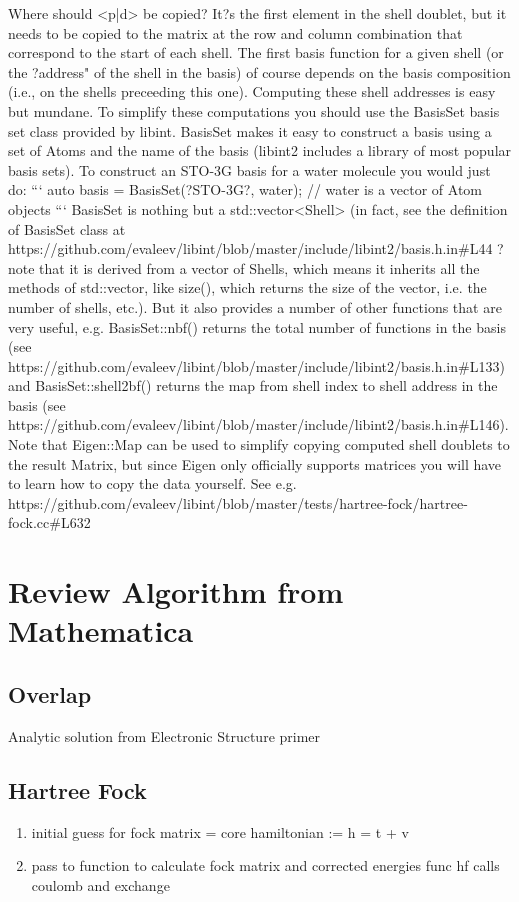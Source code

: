 \documentclass[11pt, oneside]{article}   	%
\begin{document}
Where should <p|d> be copied? It?s the first element in the shell doublet, but it needs to be copied to the matrix at the row and column combination that correspond to the start of each shell. The first basis function for a given shell (or the ?address" of the shell in the basis) of course depends on the basis composition (i.e., on the shells preceeding this one). Computing these shell addresses is easy but mundane. To simplify these computations you should use the BasisSet basis set class provided by libint.
BasisSet makes it easy to construct a basis using a set of Atoms and the name of the basis (libint2 includes a library of most popular basis sets). To construct an STO-3G basis for a water molecule you would just do:
```
auto basis = BasisSet(?STO-3G?, water);  // water is a vector of Atom objects
```
BasisSet is nothing but a std::vector<Shell> (in fact, see the definition of BasisSet class at https://github.com/evaleev/libint/blob/master/include/libint2/basis.h.in\#L44  ? note that it is derived from a vector of Shells, which means it inherits all the methods of std::vector, like size(), which returns the size of the vector, i.e. the number of shells, etc.). But it also provides a number of other functions that are very useful, e.g. BasisSet::nbf() returns the total number of functions in the basis (see https://github.com/evaleev/libint/blob/master/include/libint2/basis.h.in\#L133) and BasisSet::shell2bf() returns the map from shell index to shell address in the basis (see https://github.com/evaleev/libint/blob/master/include/libint2/basis.h.in\#L146).
Note that Eigen::Map can be used to simplify copying computed shell doublets to the result Matrix, but since Eigen only officially supports matrices you will have to learn how to copy the data yourself. See e.g. https://github.com/evaleev/libint/blob/master/tests/hartree-fock/hartree-fock.cc\#L632

%
\section{Review Algorithm from Mathematica}
\subsection{Overlap}
Analytic solution from Electronic Structure primer
\subsection{Hartree Fock}
\begin{enumerate}
	\item initial guess for fock matrix = core hamiltonian := h = t + v
	\item pass to function to calculate fock matrix and corrected energies
	\subitem func hf calls coulomb and exchange
\end{enumerate}
\end{document}
